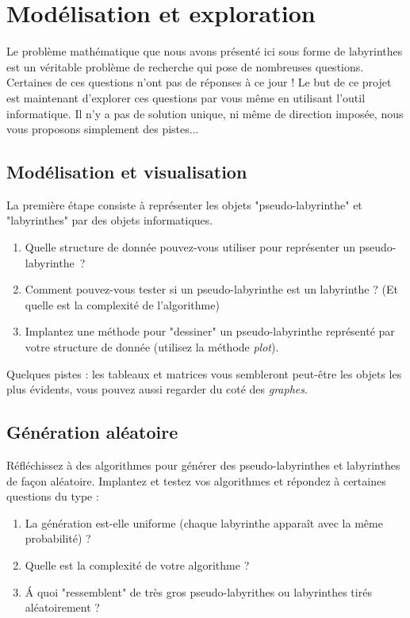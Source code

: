 \documentclass{../ficheTDTP}
\begin{document}
\section{Modélisation et exploration}

Le problème mathématique que nous avons présenté ici sous forme de labyrinthes est un véritable problème de recherche qui pose de nombreuses questions. Certaines de ces questions n'ont pas de réponses à ce jour ! Le but de ce projet est maintenant d'explorer ces questions par vous même en utilisant l'outil informatique. Il n'y a pas de solution unique, ni même de direction imposée, nous vous proposons simplement des pistes...

\subsection{Modélisation et visualisation}

La première étape consiste à représenter les objets "pseudo-labyrinthe" et "labyrinthes" par des objets informatiques.

\begin{enumerate}
\item Quelle structure de donnée pouvez-vous utiliser pour représenter un pseudo-labyrinthe~?

\item Comment pouvez-vous tester si un pseudo-labyrinthe est un labyrinthe ? (Et quelle est la complexité de l'algorithme)

\item Implantez une méthode pour "dessiner" un pseudo-labyrinthe représenté par votre structure de donnée (utilisez la méthode \emph{plot}).
\end{enumerate}

Quelques pistes : les tableaux et matrices vous sembleront peut-être les objets les plus évidents, vous pouvez aussi regarder du coté des \emph{graphes}.

\subsection{Génération aléatoire}

Réfléchissez à des algorithmes pour générer des pseudo-labyrinthes et labyrinthes de façon aléatoire. Implantez et testez vos algorithmes et répondez à certaines questions du type :

\begin{enumerate}
\item La génération est-elle uniforme (chaque labyrinthe apparaît avec la même probabilité) ?

\item Quelle est la complexité de votre algorithme ?

\item \'A quoi "ressemblent" de très gros pseudo-labyrithes ou labyrinthes tirés aléatoirement ?
\end{enumerate}
\end{document}
